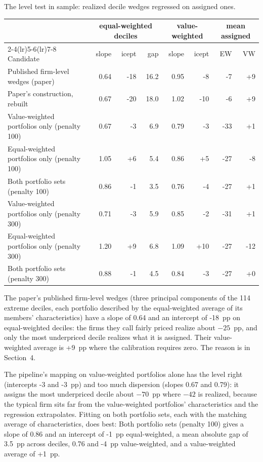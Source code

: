 \documentclass[11pt]{article}
\begin{document}
\begin{tbl}{The level test in sample: realized decile wedges regressed on assigned ones.}
\begin{tabular}{lrrrrrrr}\toprule
 & \multicolumn{3}{c}{equal-weighted deciles} & \multicolumn{2}{c}{value-weighted} & \multicolumn{2}{c}{mean assigned}\\
\cmidrule(lr){2-4}\cmidrule(lr){5-6}\cmidrule(lr){7-8}
Candidate & slope & icept & gap & slope & icept & EW & VW\\\midrule
Published firm-level wedges (paper) & 0.64 & -18 & 16.2 & 0.95 & -8 & -7 & +9\\
Paper's construction, rebuilt & 0.67 & -20 & 18.0 & 1.02 & -10 & -6 & +9\\
Value-weighted portfolios only (penalty 100) & 0.67 & -3 & 6.9 & 0.79 & -3 & -33 & +1\\
Equal-weighted portfolios only (penalty 100) & 1.05 & +6 & 5.4 & 0.86 & +5 & -27 & -8\\
Both portfolio sets (penalty 100) & 0.86 & -1 & 3.5 & 0.76 & -4 & -27 & +1\\
Value-weighted portfolios only (penalty 300) & 0.71 & -3 & 5.9 & 0.85 & -2 & -31 & +1\\
Equal-weighted portfolios only (penalty 300) & 1.20 & +9 & 6.8 & 1.09 & +10 & -27 & -12\\
Both portfolio sets (penalty 300) & 0.88 & -1 & 4.5 & 0.84 & -3 & -27 & +0\\
\bottomrule
\end{tabular}
\end{tbl}

The paper's published firm-level wedges (three principal components of the
114 extreme deciles, each portfolio described by the equal-weighted average
of its members' characteristics) have a slope of 0.64 and an intercept of
-18~pp on equal-weighted deciles: the firms they call fairly priced
realize about $-25$~pp, and only the most underpriced decile realizes what it
is assigned. Their value-weighted average is +9~pp where the
calibration requires zero. The reason is in Section~4.

The pipeline's mapping on value-weighted portfolios alone has the level
right (intercepts -3 and -3~pp) and too much dispersion (slopes
0.67 and 0.79): it assigns the most underpriced decile about $-70$~pp
where $-42$ is realized, because the typical firm sits far from the
value-weighted portfolios' characteristics and the regression extrapolates.
Fitting on both portfolio sets, each with the matching average of
characteristics, does best: Both portfolio sets (penalty 100) gives a slope of 0.86 and an
intercept of -1~pp equal-weighted, a mean absolute gap of 3.5~pp
across deciles, 0.76 and -4~pp value-weighted, and a value-weighted
average of +1~pp.
\end{document}

